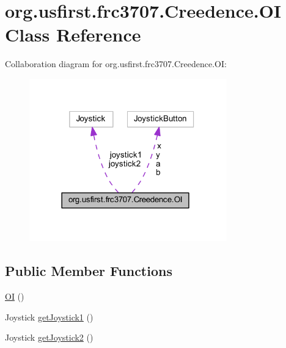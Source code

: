 \hypertarget{classorg_1_1usfirst_1_1frc3707_1_1_creedence_1_1_o_i}{}\section{org.\+usfirst.\+frc3707.\+Creedence.\+OI Class Reference}
\label{classorg_1_1usfirst_1_1frc3707_1_1_creedence_1_1_o_i}


Collaboration diagram for org.\+usfirst.\+frc3707.\+Creedence.\+OI\+:
\nopagebreak
\begin{figure}[H]
\begin{center}
\leavevmode
\includegraphics[width=242pt]{classorg_1_1usfirst_1_1frc3707_1_1_creedence_1_1_o_i__coll__graph}
\end{center}
\end{figure}
\subsection*{Public Member Functions}
\begin{DoxyCompactItemize}
\item 
\mbox{\hyperlink{classorg_1_1usfirst_1_1frc3707_1_1_creedence_1_1_o_i_a2835556e3b8a249fc0b451e0a7bcef9b}{OI}} ()
\item 
Joystick \mbox{\hyperlink{classorg_1_1usfirst_1_1frc3707_1_1_creedence_1_1_o_i_aa86c5c9b8024eed18619dfa3c481607e}{get\+Joystick1}} ()
\item 
Joystick \mbox{\hyperlink{classorg_1_1usfirst_1_1frc3707_1_1_creedence_1_1_o_i_a13450299923273f5bc07fe43d1ad937e}{get\+Joystick2}} ()
\end{DoxyCompactItemize}
